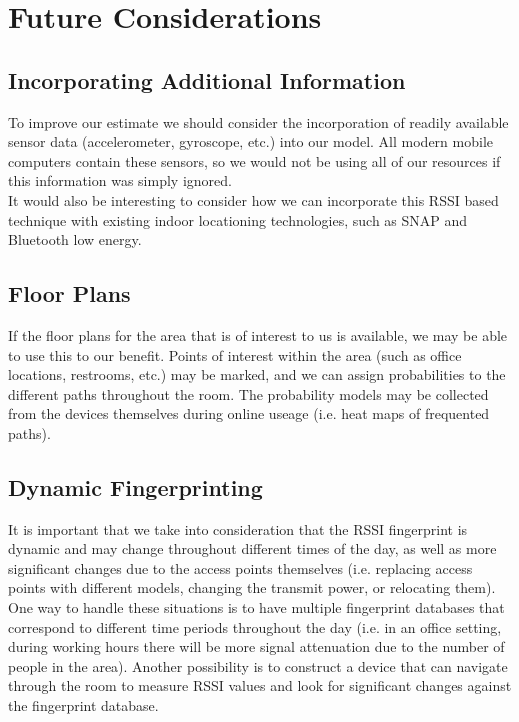 \documentclass[12pt, a4paper]{article}
\begin{document}
	\section{Future Considerations}
		\subsection{Incorporating Additional Information}
			To improve our estimate we should consider the incorporation of readily available sensor data (accelerometer, gyroscope, etc.) into our model. All modern mobile computers contain these sensors, so we would not be using all of our resources if this information was simply ignored. \\
			It would also be interesting to consider how we can incorporate this RSSI based technique with existing indoor locationing technologies, such as SNAP and Bluetooth low energy.
		\subsection{Floor Plans}
			If the floor plans for the area that is of interest to us is available, we may be able to use this to our benefit. Points of interest within the area (such as office locations, restrooms, etc.) may be marked, and we can assign probabilities to the different paths throughout the room. The probability models may be collected from the devices themselves during online useage (i.e. heat maps of frequented paths).
		\subsection{Dynamic Fingerprinting}
			It is important that we take into consideration that the RSSI fingerprint is dynamic and may change throughout different times of the day, as well as more significant changes due to the access points themselves (i.e. replacing access points with different models, changing the transmit power, or relocating them). One way to handle these situations is to have multiple fingerprint databases that correspond to different time periods throughout the day (i.e. in an office setting, during working hours there will be more signal attenuation due to the number of people in the area). Another possibility is to construct a device that can navigate through the room to measure RSSI values and look for significant changes against the fingerprint database.
\end{document}

